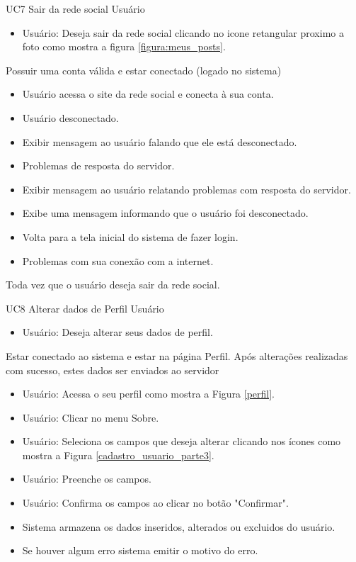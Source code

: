 \casoDeUso
{UC7}
{Sair da rede social}
{Usuário}
{
\begin{itemize}
	\item Usuário: Deseja sair da rede social clicando no icone retangular proximo a foto como mostra a figura  \ref{figura:meus_posts}.
\end{itemize}

}
{Possuir uma conta válida e estar conectado (logado no sistema)}
{}
{
\begin{itemize}
	\item Usuário acessa o site da rede social e  conecta à sua conta.
	
\end{itemize}
}
{
\begin{itemize}
	\item Usuário desconectado.
	\item Exibir mensagem  ao usuário falando que ele está desconectado.
	\item Problemas de resposta do servidor.
	\item Exibir mensagem  ao usuário relatando problemas com resposta do servidor.
	\item Exibe uma mensagem informando que o usuário foi desconectado.
	\item Volta para a tela inicial do sistema de fazer login.
	\item Problemas com sua conexão com a internet.
\end{itemize}
}
{Toda  vez que o usuário deseja sair da rede social.}
{

}
\casoDeUso
{UC8}
{Alterar dados de Perfil}
{Usuário}
{
\begin{itemize}
	\item Usuário: Deseja alterar seus dados de perfil.	
\end{itemize}
}
{Estar conectado ao sistema e estar na página Perfil.}
{Após alterações realizadas com sucesso, estes dados ser enviados ao servidor}
{
\begin{itemize}
	\item Usuário: Acessa o seu perfil como mostra a Figura \ref{perfil}.
	\item Usuário: Clicar no menu Sobre.
	\item Usuário: Seleciona os campos que deseja alterar clicando nos ícones como mostra a Figura \ref{cadastro_usuario_parte3}.
	\item Usuário: Preenche os campos.
	\item Usuário: Confirma os campos ao clicar no botão "Confirmar".
	\item Sistema armazena os dados inseridos, alterados ou excluidos do usuário.
	\item Se houver algum erro sistema emitir o motivo do erro.
\end{itemize}
}
